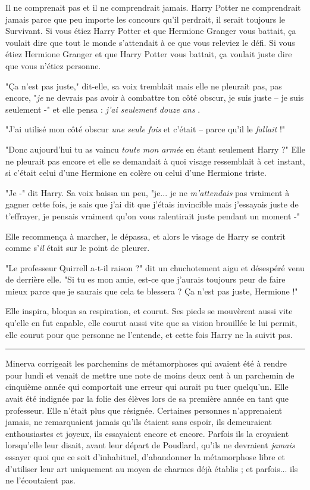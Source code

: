 Il ne comprenait pas et il ne comprendrait jamais. Harry Potter ne comprendrait jamais parce que peu importe les concours qu'il perdrait, il serait toujours le Survivant. Si vous étiez Harry Potter et que Hermione Granger vous battait, ça voulait dire que tout le monde s'attendait à ce que vous releviez le défi. Si vous étiez Hermione Granger et que Harry Potter vous battait, ça voulait juste dire que vous n'étiez personne.

"Ça n'est pas juste," dit-elle, sa voix tremblait mais elle ne pleurait pas, pas encore, "\emph{je}  ne devrais pas avoir à combattre ton côté obscur, je suis juste – je suis seulement -" et elle pensa : \emph{j'ai seulement douze ans} .

"J'ai utilisé mon côté obscur \emph{une seule fois}  et c'était – parce qu'il le \emph{fallait } !"

"Donc aujourd'hui tu as vaincu \emph{toute mon armée } en étant seulement Harry ?" Elle ne pleurait pas encore et elle se demandait à quoi visage ressemblait à cet instant, si c'était celui d'une Hermione en colère ou celui d'une Hermione triste.

"Je -" dit Harry. Sa voix baissa un peu, "je... je ne \emph{m'attendais } pas vraiment à gagner cette fois, je sais que j'ai dit que j'étais invincible mais j'essayais juste de t'effrayer, je pensais vraiment qu'on vous ralentirait juste pendant un moment -"

Elle recommença à marcher, le dépassa, et alors le visage de Harry se contrit comme s'\emph{il}  était sur le point de pleurer.

"Le professeur Quirrell a-t-il raison ?" dit un chuchotement aigu et désespéré venu de derrière elle. "Si tu es mon amie, est-ce que j'aurais toujours peur de faire mieux parce que je saurais que cela te blessera ? Ça n'est pas juste, Hermione !"

Elle inspira, bloqua sa respiration, et courut. Ses pieds se mouvèrent aussi vite qu'elle en fut capable, elle courut aussi vite que sa vision brouillée le lui permit, elle courut pour que personne ne l'entende, et cette fois Harry ne la suivit pas.
\par\noindent\rule{\textwidth}{0.4pt}
Minerva corrigeait les parchemins de métamorphoses qui avaient été à rendre pour lundi et venait de mettre une note de moins deux cent à un parchemin de cinquième année qui comportait une erreur qui aurait pu tuer quelqu'un. Elle avait été indignée par la folie des élèves lors de sa première année en tant que professeur. Elle n'était plus que résignée. Certaines personnes n'apprenaient jamais, ne remarquaient jamais qu'ils étaient sans espoir, ils demeuraient enthousiastes et joyeux, ils essayaient encore et encore. Parfois ils la croyaient lorsqu'elle leur disait, avant leur départ de Poudlard, qu'ils ne devraient \emph{jamais}  essayer quoi que ce soit d'inhabituel, d'abandonner la métamorphose libre et d'utiliser leur art uniquement au moyen de charmes déjà établis ; et parfois... ils ne l'écoutaient pas.

